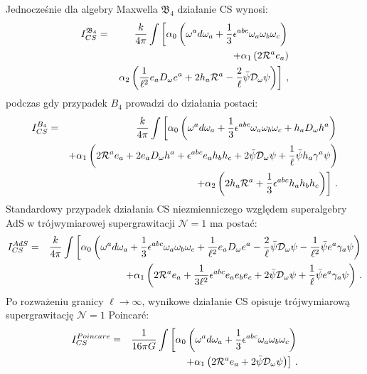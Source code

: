 \documentclass[12pt,a4paper]{article}
\begin{document}
Jednocześnie dla algebry Maxwella $\mathfrak{B}_4$ działanie CS wynosi:
\begin{eqnarray}\label{CSmathfrak_B4} 
	I_{CS}^{\mathfrak{B}_{4}} &=&\frac{k}{4\pi }\int \left[ \alpha _{0}\left(
	\omega ^{a}d\omega _{a}+\frac{1}{3}\epsilon ^{abc}\omega _{a}\omega
	_{b}\omega _{c}\right)\right. \notag\\
	&& +\alpha _{1}\left( 2\mathcal{R}^{a}e_{a}\right)\notag\\
	&&\left. \alpha _{2}\left(\frac{1}{\ell^2}
	e_{a}D_{\omega }e^{a}+2h_{a}\mathcal{R}^{a}-\frac{2}{\ell}\bar{\psi}\mathcal{D}_{\omega }\psi\right) \right] \,,
\end{eqnarray}
podczas gdy przypadek $B_4$ prowadzi do działania postaci:
\begin{eqnarray}
	I_{CS}^{B_{4}} &=&\frac{k}{4\pi }\int \left[ \alpha _{0}\left(
	\omega ^{a}d\omega _{a}+\frac{1}{3}\epsilon ^{abc}\omega _{a}\omega
	_{b}\omega _{c}+h_{a}D_{\omega}h^{a}\right)   \right.  \notag \\
	&&+\alpha _{1}\left(2\mathcal{R}^{a}e_{a}+2e_{a}D_{\omega }h^{a}+\epsilon ^{abc}e_{a}h_{b}h_{c}+2
	\bar{\psi}\mathcal{D}_\omega \psi+\frac{1}{\ell} \bar{\psi}h_{a}\gamma^{a} \psi \right)\notag\\
	&&\left.  +\alpha _{2}\left(2h_{a}\mathcal{R}
	^{a}+\frac{1}{3}\epsilon ^{abc}h_{a}h_{b}h_{c} \right) \right]\,.  \label{CS_B4} 
\end{eqnarray}
Standardowy przypadek działania CS niezmienniczego względem superalgebry AdS w trójwymiarowej supergrawitacji $\mathcal{N}=1$ ma postać:
\begin{eqnarray}
	I_{CS}^{AdS} &=&\frac{k}{4\pi }\int \left[ \alpha _{0}\left(
	\omega ^{a}d\omega _{a}+\frac{1}{3}\epsilon^{abc}\omega _{a}\omega
	_{b}\omega _{c}+\frac{1}{\ell^2}e_{a}D_{\omega }e^{a}-\frac{2}{\ell}\bar{\psi}\mathcal{D}_{\omega }\psi-\frac{1}{\ell^2}\bar{\psi}e^{a}\gamma_{a}\psi\right) \right.  \notag \\
	&& +\alpha _{1}\left( 2 \mathcal{R}^{a}e_{a}+\frac{1}{3\ell^2}\epsilon
	^{abc}e_{a}e_{b}e_{c}+2
	\bar{\psi}\mathcal{D}_{\omega }\psi+\frac{1}{\ell}
	\bar{\psi}e^{a}\gamma_{a}\psi \right) \label{CSAdS}\,.
\end{eqnarray}
Po rozważeniu granicy $\ell \rightarrow \infty $, wynikowe działanie CS opisuje trójwymiarową supergrawitację $\mathcal{N}=1$ Poincar\'e:
\begin{eqnarray}
	I_{CS}^{Poincare}&=&\frac{1}{16\pi G }\int \left[ \alpha_{0}\left( \omega
	^{a}d\omega _{a}+\frac{1}{3}\epsilon ^{abc}\omega _{a}\omega _{b}\omega
	_{c} \right)\right.  \notag \\
	& &\left.+\alpha _{1}\left( 2\mathcal{R}^{a}e_{a}+2\bar{\psi} \mathcal{D}_{\omega}\psi \right) \right] \,.
\end{eqnarray}
\end{document}
